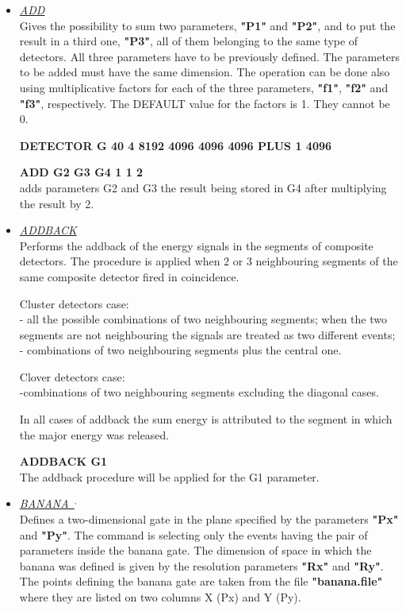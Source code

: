 \begin{itemize}
 \item	{\it\underline{ADD}} \\

	Gives the possibility to sum two parameters, {\bf "P1"} and 
	{\bf "P2"}, and 
	to put the result in a third one, {\bf "P3"}, all of them belonging to 
	the same type of detectors. All three parameters have to be previously
	defined. The parameters to be added must have the same dimension. The 
	operation can be done also
	using multiplicative factors for each of the three parameters, 
	{\bf "f1"}, {\bf "f2"} and {\bf "f3"}, respectively. The DEFAULT 
	value for the factors is 1. They cannot be 0. 

	\hskip1cm{\bf DETECTOR G 40 4 8192 4096 4096 4096 PLUS 1 4096 }

	\hskip1cm{\bf ADD G2 G3 G4  1 1 2 } \\
	adds parameters G2 and G3 the result being stored in G4 after 
	multiplying the result by 2.

 \item	{\it\underline{ADDBACK}} \\
	
	Performs the addback of the energy signals in the segments of 
	composite detectors. The procedure is applied when 2 or 3 
	neighbouring segments
	of the same composite detector fired in coincidence.

	Cluster detectors case: \\
	- all the possible combinations of two neighbouring segments;
	when the two segments are not neighbouring the signals are 
	treated as two different events;\\
	- combinations of two neighbouring segments plus the central 
	one.

	Clover detectors case: \\
	-combinations of two neighbouring segments excluding the diagonal 
	cases.
 
	In all cases of addback the sum energy is attributed to the 
	segment in which the major energy was released.

	\hskip1cm{\bf ADDBACK G1}\\
	The addback procedure will be applied for the G1 parameter.

 \item	{\it\underline{BANANA~}}\footnotemark[2]$^,$\footnotemark[3] \\

	Defines a two-dimensional gate in the plane specified by the
	parameters {\bf "Px"} and {\bf "Py"}. 
	The command is selecting only the events having the 
	pair of parameters inside the banana gate. The dimension of 
	space in which the banana was defined is given by the resolution
	parameters {\bf "Rx"} and {\bf "Ry"}. 
	The points defining the banana gate are taken from the file 
	{\bf "banana.file"} where they are listed on two columns X (Px) and 
	Y (Py).


\end{itemize}
